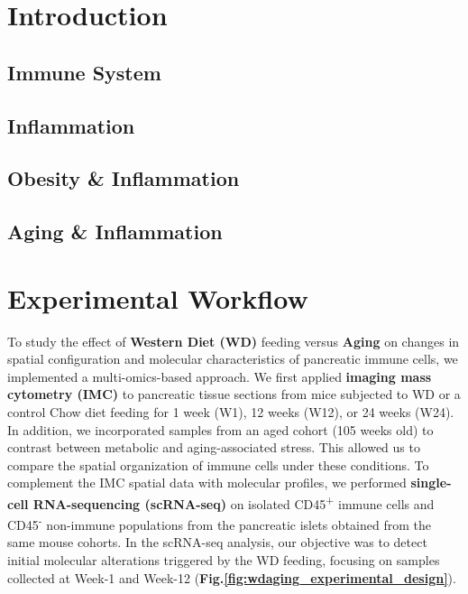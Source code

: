 \clearpage

\section{Introduction}
\label{sec:endodiff_intro}

\subsection{Immune System}
\subsection{Inflammation}
\subsection{Obesity \& Inflammation}
\subsection{Aging \& Inflammation}


\newpage

\section{Experimental Workflow}
\label{sec:endodiff_summary}

To study the effect of \textbf{Western Diet (WD)} feeding versus \textbf{Aging} on changes in spatial configuration and molecular characteristics of pancreatic immune cells, we implemented a multi-omics-based approach. We first applied \textbf{imaging mass cytometry (IMC)} to pancreatic tissue sections from mice subjected to WD or a control Chow diet feeding for 1 week (W1), 12 weeks (W12), or 24 weeks (W24). In addition, we incorporated samples from an aged cohort (105 weeks old) to contrast between metabolic and aging-associated stress. This allowed us to compare the spatial organization of immune cells under these conditions. To complement the IMC spatial data with molecular profiles, we performed \textbf{single-cell RNA-sequencing (scRNA-seq)} on isolated CD45\textsuperscript{+} immune cells and CD45\textsuperscript{-} non-immune populations from the pancreatic islets obtained from the same mouse cohorts. In the scRNA-seq analysis, our objective was to detect initial molecular alterations triggered by the WD feeding, focusing on samples collected at Week-1 and Week-12 (\textbf{Fig.\ref{fig:wdaging_experimental_design}}).

